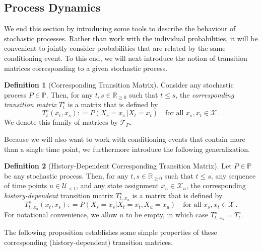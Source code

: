 \documentclass[10pt,a4paper]{paper}
\theoremstyle{definition}
\newtheorem{definition}{Definition}
\newcommand{\reals}{\mathbb{R}}
\newcommand{\realsnonneg}{\reals_{\geq 0}}
\newcommand{\states}{\mathcal{X}}
\newcommand{\processes}{\mathbb{P}}
\newcommand{\coloneqq}{:\!=}
\begin{document}
\subsection{Process Dynamics}\label{sec:dynamics}

We end this section by introducing some tools to describe the behaviour of stochastic processes. Rather than work with the individual probabilities, it will be convenient to jointly consider probabilities that are related by the same conditioning event. To this end, we will next introduce the notion of transition matrices corresponding to a given stochastic process.

\begin{definition}[Corresponding Transition Matrix]\label{def:trans_matrix}
Consider any stochastic process $P\in\processes$. Then, for any $t,s\in\realsnonneg$ such that $t\leq s$, the \emph{corresponding transition matrix} $T_t^s$ is a matrix that is defined by
\begin{equation*}
T_t^s(x_t, x_s) \coloneqq P(X_s=x_s\,\vert X_t=x_t)\quad\text{for all $x_s,x_t\in\states$}\,.
\end{equation*}
We denote this family of matrices by $\mathcal{T}_P$.%
\end{definition}

Because we will also want to work with conditioning events that contain more than a single time point, we furthermore introduce the following generalization.

\begin{definition}[History-Dependent Corresponding Transition Matrix]
Let $P\in\processes$ be any stochastic process. Then, for any $t,s\in\realsnonneg$ such that $t\leq s$, any sequence of time points $u\in\mathcal{U}_{<t}$, and any state assignment $x_u\in\states_u$, the corresponding \emph{history-dependent} transition matrix $T_{t,\,x_u}^s$ is a matrix that is defined by
\begin{equation*}
T^s_{t,\,x_u}(x_t,x_s)
\coloneqq
P(X_s=x_s\vert X_t=x_t, X_u=x_u)\quad\text{for all $x_s,x_t\in\states$}\,.
\end{equation*}
For notational convenience, we allow $u$ to be empty, in which case $T_{t,\,x_u}^s=T_t^s$.
\end{definition}

The following proposition establishes some simple properties of these corresponding (history-dependent) transition matrices.
\end{document}
